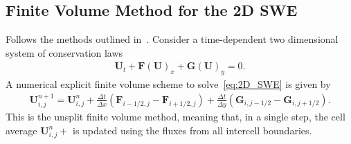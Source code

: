 \subsection{Finite Volume Method for the 2D SWE}
Follows the methods outlined in~\cite{Toro2009-Riemann}.
Consider a time-dependent two dimensional system of conservation laws
\begin{align}\label{eq:2D_SWE}
    \mathbf{U}_t + \mathbf{F(U)}_x + \mathbf{G(U)}_y = 0.
\end{align}
A numerical explicit finite volume scheme to solve~\eqref{eq:2D_SWE} is given by
\begin{align}
    \mathbf{U}_{i,j}^{n+1} = \mathbf{U}_{i,j}^n + \frac{\Delta t}{\Delta x}(\mathbf{F}_{i-1/2,j} - \mathbf{F}_{i+1/2,j}) + \frac{\Delta t}{\Delta y}(\mathbf{G}_{i,j-1/2} - \mathbf{G}_{i,j+1/2}).
\end{align}
This is the unsplit finite volume method, meaning that, in a single step, the cell average $\mathbf{U}_{i,j}^n+$ is updated using the fluxes from all intercell boundaries.

